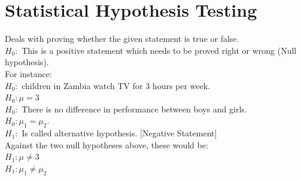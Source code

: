 \documentclass[11pt,a4paper]{article}
\theoremstyle{definition}
\begin{document}
\section{Statistical Hypothesis Testing}
Deals with proving whether the given statement is true or false.\\

$H_0:$ This is a positive statement which needs to be proved right or wrong (Null hypothesis).\\


For instance:\\

$H_0:$ children in Zambia watch TV for 3 hours per week.\\
$H_0: \mu=3$\\


$H_0:$ There is no difference in performance between boys and girls.\\
$H_0: \mu_1=\mu_2$.\\

$H_1:$ Is called alternative hypothesis. [Negative Statement]\\[1ex]
Against the two null hypotheses above, these would be:\\
$H_1 : \mu\neq 3$\\
$H_1: \mu_1 \neq \mu_2$\\[1ex]
\end{document}

